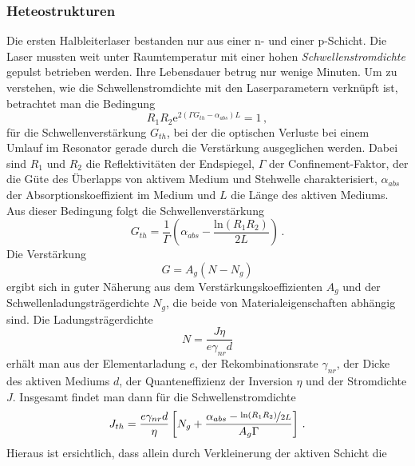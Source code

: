 \subsubsection{Heteostrukturen}\label{heterostrukturen}
Die ersten Halbleiterlaser bestanden nur aus einer n- und einer
p-Schicht. Die Laser mussten weit unter Raumtemperatur mit einer hohen
\textit{Schwellenstromdichte} gepulst betrieben werden. Ihre Lebensdauer betrug
nur wenige Minuten. Um zu verstehen, wie die Schwellenstromdichte mit den
Laserparametern verknüpft ist, betrachtet man die Bedingung
\begin{equation}\label{eq:schwellenbedingung}
	R_1R_2\mathrm{e}^{2\left(\Gamma G_{th}-\alpha_{abs}\right)L}=1\,,
\end{equation}
für die Schwellenverstärkung $G_{th}$, bei der die optischen Verluste bei einem
Umlauf im Resonator gerade durch die Verstärkung ausgeglichen werden.
Dabei sind $R_1$ und $R_2$ die Reflektivitäten der Endspiegel, $\Gamma$ der
Confinement-Faktor, der die Güte des Überlapps von aktivem Medium und
Stehwelle charakterisiert, $\alpha_{abs}$ der Absorptionskoeffizient im
Medium und $L$ die Länge des aktiven Mediums. Aus dieser Bedingung folgt die
Schwellenverstärkung
\begin{equation}\label{eq:schwellenverstärkung}
	G_{th}=\frac{1}{\Gamma}\left(\alpha_{abs}-\frac{\mathrm{ln}{(R_1R_2)}}{2L}\right)\,.
\end{equation}
Die Verstärkung
\begin{equation}\label{eq:laser-verstärkung}
	G=A_g\left(N-N_g\right)
\end{equation}
ergibt sich in guter Näherung aus dem Verstärkungskoeffizienten $A_g$ und der
Schwellenladungsträgerdichte $N_g$, die beide von Materialeigenschaften abhängig
sind. Die Ladungsträgerdichte
\begin{equation}\label{eq:ladungstraegerdichte}
	N=\frac{J\eta}{e\gamma_{nr}d}
\end{equation}
erhält man aus der Elementarladung $e$, der Rekombinationsrate $\gamma_{nr}$,
der Dicke des aktiven Mediums $d$, der Quanteneffizienz der Inversion $\eta$ und der
Stromdichte $J$. Insgesamt findet man dann für die Schwellenstromdichte
\begin{equation}\label{eq:schwellenstromdichte}
	J_{th}=\frac{e\gamma_{nr}d}{\eta}\left[N_g+\frac{\alpha_{abs}-\nicefrac{\mathrm{ln}{\left(R_1R_2\right)}}{2L}}{A_g\Gamma}\right]\,.
\end{equation}
Hieraus ist ersichtlich, dass allein durch Verkleinerung der aktiven Schicht die
